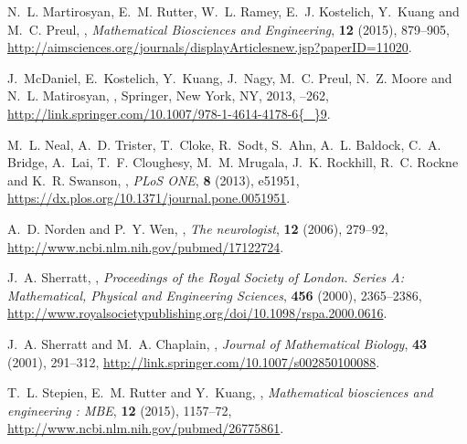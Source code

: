 \documentclass{aims}
\numberwithin{equation}{section}
\begin{document}
\begin{thebibliography}{10}
\newblock N.~L. Martirosyan, E.~M. Rutter, W.~L. Ramey, E.~J. Kostelich,
  Y.~Kuang and M.~C. Preul,
,
\newblock \emph{Mathematical Biosciences and Engineering}, \textbf{12} (2015),
  879--905,
\newblock
  \urlprefix\url{http://aimsciences.org/journals/displayArticlesnew.jsp?paperID=11020}.

\newblock J.~McDaniel, E.~Kostelich, Y.~Kuang, J.~Nagy, M.~C. Preul, N.~Z.
  Moore and N.~L. Matirosyan,
,
\newblock Springer, New York, NY, 2013,
--262,
\newblock
  \urlprefix\url{http://link.springer.com/10.1007/978-1-4614-4178-6{\_}9}.

\newblock M.~L. Neal, A.~D. Trister, T.~Cloke, R.~Sodt, S.~Ahn, A.~L. Baldock,
  C.~A. Bridge, A.~Lai, T.~F. Cloughesy, M.~M. Mrugala, J.~K. Rockhill, R.~C.
  Rockne and K.~R. Swanson,
,
\newblock \emph{PLoS ONE}, \textbf{8} (2013), e51951,
\newblock \urlprefix\url{https://dx.plos.org/10.1371/journal.pone.0051951}.

\newblock A.~D. Norden and P.~Y. Wen,
,
\newblock \emph{The neurologist}, \textbf{12} (2006), 279--92,
\newblock \urlprefix\url{http://www.ncbi.nlm.nih.gov/pubmed/17122724}.

\newblock J.~A. Sherratt,
,
\newblock \emph{Proceedings of the Royal Society of London. Series A:
  Mathematical, Physical and Engineering Sciences}, \textbf{456} (2000),
  2365--2386,
\newblock
  \urlprefix\url{http://www.royalsocietypublishing.org/doi/10.1098/rspa.2000.0616}.

\newblock J.~A. Sherratt and M.~A. Chaplain,
,
\newblock \emph{Journal of Mathematical Biology}, \textbf{43} (2001), 291--312,
\newblock \urlprefix\url{http://link.springer.com/10.1007/s002850100088}.

\newblock T.~L. Stepien, E.~M. Rutter and Y.~Kuang,
,
\newblock \emph{Mathematical biosciences and engineering : MBE}, \textbf{12}
  (2015), 1157--72,
\newblock \urlprefix\url{http://www.ncbi.nlm.nih.gov/pubmed/26775861}.


\end{thebibliography}
\end{document}
